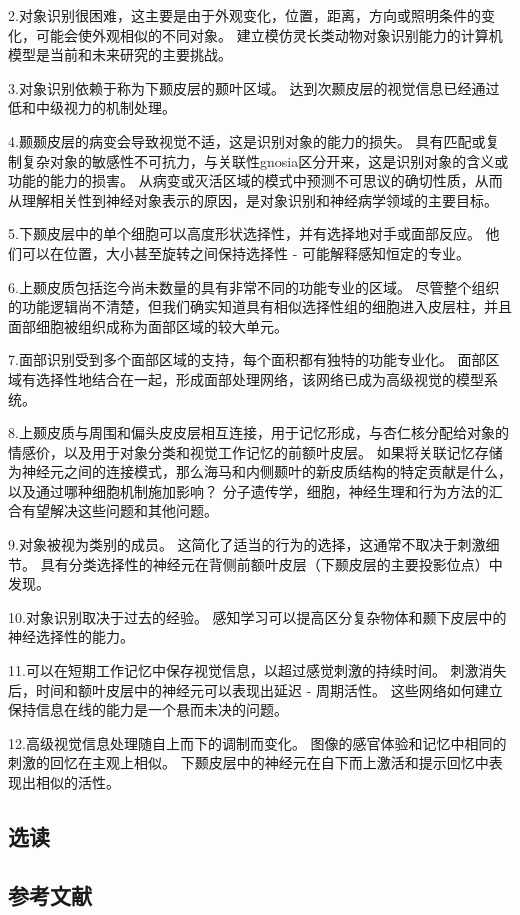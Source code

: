 2.对象识别很困难，这主要是由于外观变化，位置，距离，方向或照明条件的变化，可能会使外观相似的不同对象。 建立模仿灵长类动物对象识别能力的计算机模型是当前和未来研究的主要挑战。 

3.对象识别依赖于称为下颞皮层的颞叶区域。 达到次颞皮层的视觉信息已经通过低和中级视力的机制处理。 

4.颞颞皮层的病变会导致视觉不适，这是识别对象的能力的损失。 具有匹配或复制复杂对象的敏感性不可抗力，与关联性gnosia区分开来，这是识别对象的含义或功能的能力的损害。 从病变或灭活区域的模式中预测不可思议的确切性质，从而从理解相关性到神经对象表示的原因，是对象识别和神经病学领域的主要目标。 

5.下颞皮层中的单个细胞可以高度形状选择性，并有选择地对手或面部反应。 他们可以在位置，大小甚至旋转之间保持选择性 - 可能解释感知恒定的专业。 

6.上颞皮质包括迄今尚未数量的具有非常不同的功能专业的区域。 尽管整个组织的功能逻辑尚不清楚，但我们确实知道具有相似选择性组的细胞进入皮层柱，并且面部细胞被组织成称为面部区域的较大单元。 

7.面部识别受到多个面部区域的支持，每个面积都有独特的功能专业化。 面部区域有选择性地结合在一起，形成面部处理网络，该网络已成为高级视觉的模型系统。 

8.上颞皮质与周围和偏头皮皮层相互连接，用于记忆形成，与杏仁核分配给对象的情感价，以及用于对象分类和视觉工作记忆的前额叶皮层。 如果将关联记忆存储为神经元之间的连接模式，那么海马和内侧颞叶的新皮质结构的特定贡献是什么，以及通过哪种细胞机制施加影响？ 分子遗传学，细胞，神经生理和行为方法的汇合有望解决这些问题和其他问题。 

9.对象被视为类别的成员。 这简化了适当的行为的选择，这通常不取决于刺激细节。 具有分类选择性的神经元在背侧前额叶皮层（下颞皮层的主要投影位点）中发现。 

10.对象识别取决于过去的经验。 感知学习可以提高区分复杂物体和颞下皮层中的神经选择性的能力。 

11.可以在短期工作记忆中保存视觉信息，以超过感觉刺激的持续时间。 刺激消失后，时间和额叶皮层中的神经元可以表现出延迟 - 周期活性。 这些网络如何建立保持信息在线的能力是一个悬而未决的问题。 

12.高级视觉信息处理随自上而下的调制而变化。 图像的感官体验和记忆中相同的刺激的回忆在主观上相似。 下颞皮层中的神经元在自下而上激活和提示回忆中表现出相似的活性。

\subsection{选读}
\subsection{参考文献}